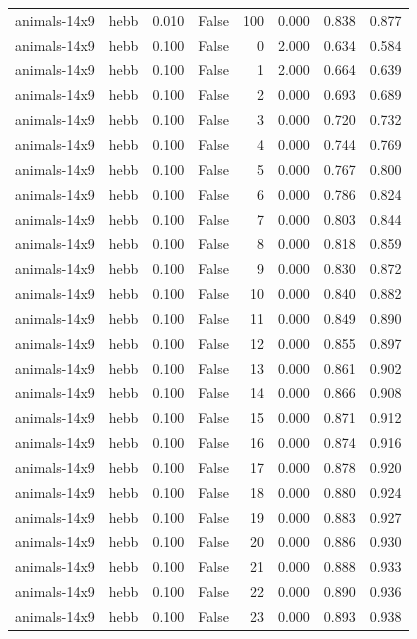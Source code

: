 \begin{tabular}{llrrrrrr}
animals-14x9 & hebb & 0.010 & False & 100 & 0.000 & 0.838 & 0.877 \\
animals-14x9 & hebb & 0.100 & False & 0 & 2.000 & 0.634 & 0.584 \\
animals-14x9 & hebb & 0.100 & False & 1 & 2.000 & 0.664 & 0.639 \\
animals-14x9 & hebb & 0.100 & False & 2 & 0.000 & 0.693 & 0.689 \\
animals-14x9 & hebb & 0.100 & False & 3 & 0.000 & 0.720 & 0.732 \\
animals-14x9 & hebb & 0.100 & False & 4 & 0.000 & 0.744 & 0.769 \\
animals-14x9 & hebb & 0.100 & False & 5 & 0.000 & 0.767 & 0.800 \\
animals-14x9 & hebb & 0.100 & False & 6 & 0.000 & 0.786 & 0.824 \\
animals-14x9 & hebb & 0.100 & False & 7 & 0.000 & 0.803 & 0.844 \\
animals-14x9 & hebb & 0.100 & False & 8 & 0.000 & 0.818 & 0.859 \\
animals-14x9 & hebb & 0.100 & False & 9 & 0.000 & 0.830 & 0.872 \\
animals-14x9 & hebb & 0.100 & False & 10 & 0.000 & 0.840 & 0.882 \\
animals-14x9 & hebb & 0.100 & False & 11 & 0.000 & 0.849 & 0.890 \\
animals-14x9 & hebb & 0.100 & False & 12 & 0.000 & 0.855 & 0.897 \\
animals-14x9 & hebb & 0.100 & False & 13 & 0.000 & 0.861 & 0.902 \\
animals-14x9 & hebb & 0.100 & False & 14 & 0.000 & 0.866 & 0.908 \\
animals-14x9 & hebb & 0.100 & False & 15 & 0.000 & 0.871 & 0.912 \\
animals-14x9 & hebb & 0.100 & False & 16 & 0.000 & 0.874 & 0.916 \\
animals-14x9 & hebb & 0.100 & False & 17 & 0.000 & 0.878 & 0.920 \\
animals-14x9 & hebb & 0.100 & False & 18 & 0.000 & 0.880 & 0.924 \\
animals-14x9 & hebb & 0.100 & False & 19 & 0.000 & 0.883 & 0.927 \\
animals-14x9 & hebb & 0.100 & False & 20 & 0.000 & 0.886 & 0.930 \\
animals-14x9 & hebb & 0.100 & False & 21 & 0.000 & 0.888 & 0.933 \\
animals-14x9 & hebb & 0.100 & False & 22 & 0.000 & 0.890 & 0.936 \\
animals-14x9 & hebb & 0.100 & False & 23 & 0.000 & 0.893 & 0.938 \\

\end{tabular}
